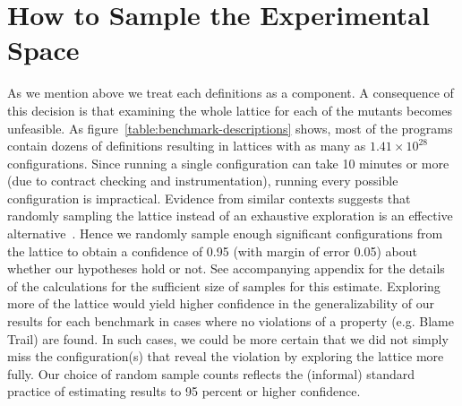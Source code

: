 \section{How to Sample the Experimental Space} 

As we mention above we treat each definitions as a component. A
consequence of this decision is that examining the whole lattice
for each of the mutants becomes unfeasible.
As figure~\ref{table:benchmark-descriptions} shows,  most of the programs contain dozens of definitions  
resulting in lattices with as many as $1.41 \times 10^{28}$ configurations.
Since running a single configuration can take 10 minutes or more 
(due to contract checking and instrumentation), running every possible configuration is impractical.
Evidence from similar contexts suggests that randomly sampling the lattice instead of
an exhaustive exploration is an effective alternative~\cite{gtnffvf-jfp-2019}.
Hence we randomly sample enough significant configurations
from the lattice to obtain a confidence of 0.95 (with margin of error
0.05) about whether our hypotheses hold or not.
See accompanying appendix for the details of the calculations for the
sufficient size of samples for this estimate.
Exploring more of the lattice would yield higher confidence in the generalizability
of our results for each benchmark in cases where no violations of a property
(e.g. Blame Trail) are found.
In such cases, we could be more certain that we did not simply miss
the configuration(s) that reveal the violation by exploring the lattice more fully.
Our choice of random sample counts reflects the (informal) standard practice of estimating
results to 95 percent or higher confidence.

